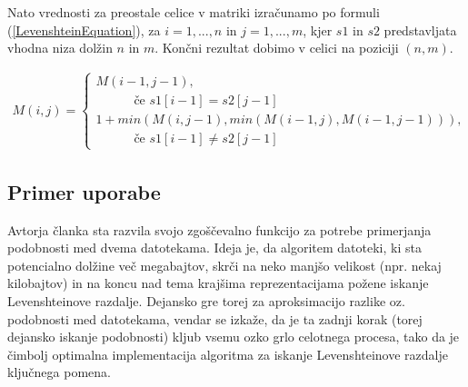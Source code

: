 \documentclass[a4paper,12pt,openright]{book}
\begin{document}
Nato vrednosti za preostale celice v matriki izračunamo po formuli (\ref{LevenshteinEquation}), za \begin{math}i=1,...,n\end{math} in \begin{math}j=1,...,m\end{math}, kjer \begin{math}s1\end{math} in \begin{math}s2\end{math} predstavljata vhodna niza dolžin \begin{math}n\end{math} in \begin{math}m\end{math}. Končni rezultat dobimo v celici na poziciji \begin{math}(n, m)\end{math}. 

\begin{equation}
\label{LevenshteinEquation}
\begin{aligned}
M(i, j) =
\begin{cases}
     M(i-1, j-1) ,     \\ \quad \quad \quad \text{če } s1[i-1]=s2[j-1]\\
     1 + min(M(i, j-1), min(M(i-1, j), M(i-1, j-1))) , \\ \quad \quad \quad \text{če } s1[i-1] \neq s2[j-1]
  \end{cases}
\end{aligned}
\end{equation}

\subsection{Primer uporabe}

Avtorja članka \cite{documentsimilarity} sta razvila svojo zgoščevalno funkcijo za potrebe primerjanja podobnosti med dvema datotekama. Ideja je, da algoritem datoteki, ki sta potencialno dolžine več megabajtov, skrči na neko manjšo velikost (npr. nekaj kilobajtov) in na koncu nad tema krajšima reprezentacijama požene iskanje Levenshteinove razdalje. Dejansko gre torej za aproksimacijo razlike oz. podobnosti med datotekama, vendar se izkaže, da je ta zadnji korak (torej dejansko iskanje podobnosti) kljub vsemu ozko grlo celotnega procesa, tako da je čimbolj optimalna implementacija algoritma za iskanje Levenshteinove razdalje ključnega pomena. 
\end{document}
